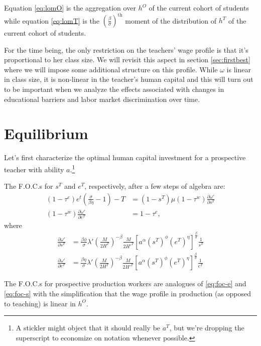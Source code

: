\documentclass[onehalfspacing,11pt]{article}
\begin{document}
Equation \eqref{eq:lomO} is the aggregation over $h^O$ of the current cohort of students while equation \eqref{eq:lomT} is the ${\left( \tfrac{\beta}{\sigma} \right)}^{\textrm{th}}$ moment of the distribution of $h^T$ of the current cohort of students.

For the time being, the only restriction on the teachers' wage profile is that it's proportional to her class size. We will revisit this aspect in section \ref{sec:firstbest} where we will impose some additional structure on this profile. While $\omega$ is linear in class size, it is non-linear in the teacher's human capital and this will turn out to be important when we analyze the effects associated with changes in educational barriers and labor market discrimination over time.

\section{Equilibrium}
Let's first characterize the optimal human capital investment for a prospective teacher with ability $a$.\footnote{A stickler might object that it should really be $a^T$, but we're dropping the superscript to economize on notation whenever possible.}

The F.O.C.s for $s^T$ and $e^T$, respectively, after a few steps of algebra are:
\begin{align}
\label{eq:foc-e}
(1-\tau^e) e^t \left( \frac{\sigma}{\beta \eta}-1 \right) - T & = \left(1-s^T\right) \mu(1-\tau^w) \frac{\partial \omega'}{\partial s^T} \\
\label{eq:foc-s}
(1-\tau^w) \frac{\partial \omega'}{\partial e^T} & = 1-\tau^e,
\end{align}
where
\begin{align}
 \frac{\partial \omega'}{\partial s^T} & =  \frac{\beta \phi}{\sigma} \lambda' \left(\frac{M}{2 H^T}\right)^{-\beta} \frac{M}{2 {{H'}^T}} \left[ a^\alpha (s^T)^\phi (e^T)^\eta \right]^{\frac{\beta}{\sigma}} \frac{1}{s^T} \nonumber \\
 \frac{\partial \omega'}{\partial e^T} & = \frac{\beta \eta}{\sigma} \lambda' \left(\frac{M}{2 H^T}\right)^{-\beta} \frac{M}{2 {{H'}^T}} \left[ a^\alpha (s^T)^\phi (e^T)^\eta \right]^{\frac{\beta}{\sigma}} \frac{1}{e^T} \nonumber
\end{align}

The F.O.C.s for prospective production workers are analogues of \eqref{eq:foc-e} and \eqref{eq:foc-s} with the simplification that the wage profile in production (as opposed to teaching) is linear in $h^O$.
\end{document}
